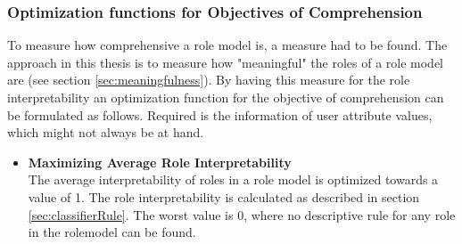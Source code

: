         \subsubsection{Optimization functions for Objectives of Comprehension}
        To measure how comprehensive a role model is, a measure had to be found. The approach in this thesis is to measure how "meaningful" the roles of a role model are (see section \ref{sec:meaningfulness}). By having this measure for the role interpretability an optimization function for the objective of comprehension can be formulated as follows. Required is the information of user attribute values, which might not always be at hand.
        \begin{itemize}
            \item \textbf{Maximizing Average Role Interpretability}\\
            The average interpretability of roles in a role model is optimized towards a value of 1. The role interpretability is calculated as described in section \ref{sec:classifierRule}. The worst value is 0, where no descriptive rule for any role in the rolemodel can be found.
        \end{itemize}

